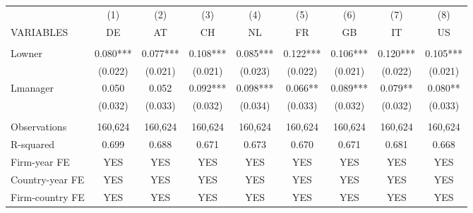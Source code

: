 \begin{tabular}{lcccccccc} \hline
 & (1) & (2) & (3) & (4) & (5) & (6) & (7) & (8) \\
VARIABLES & DE & AT & CH & NL & FR & GB & IT & US \\ \hline
 &  &  &  &  &  &  &  &  \\
Lowner & 0.080*** & 0.077*** & 0.108*** & 0.085*** & 0.122*** & 0.106*** & 0.120*** & 0.105*** \\
 & (0.022) & (0.021) & (0.021) & (0.023) & (0.022) & (0.021) & (0.022) & (0.021) \\
Lmanager & 0.050 & 0.052 & 0.092*** & 0.098*** & 0.066** & 0.089*** & 0.079** & 0.080** \\
 & (0.032) & (0.033) & (0.032) & (0.034) & (0.033) & (0.032) & (0.032) & (0.033) \\
 &  &  &  &  &  &  &  &  \\
Observations & 160,624 & 160,624 & 160,624 & 160,624 & 160,624 & 160,624 & 160,624 & 160,624 \\
R-squared & 0.699 & 0.688 & 0.671 & 0.673 & 0.670 & 0.671 & 0.681 & 0.668 \\
Firm-year FE & YES & YES & YES & YES & YES & YES & YES & YES \\
Country-year FE & YES & YES & YES & YES & YES & YES & YES & YES \\
 Firm-country FE & YES & YES & YES & YES & YES & YES & YES & YES \\ \hline
\end{tabular}
